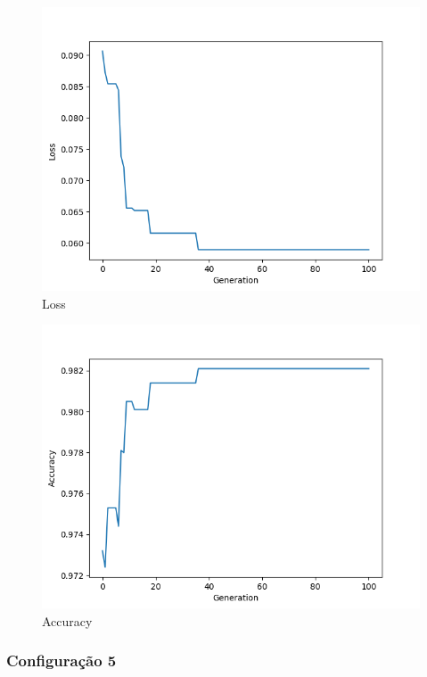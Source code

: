 \documentclass[twoside,conference,a4paper]{IEEEtran}
\begin{document}
\begin{figure}[htbp]
        \centering \includegraphics[width=1\columnwidth]{./ia_proj_images/mnist/4/loss.png}
        \caption{
                \label{fig:loss_mnist_04}
                Loss
        }
\end{figure}
\begin{figure}[htbp]
        \centering \includegraphics[width=1\columnwidth]{./ia_proj_images/mnist/4/acc.png}
        \caption{
                \label{fig:acc_mnist_04}
                Accuracy
        }
\end{figure}

\subsubsection{Configuração 5}
\end{document}
